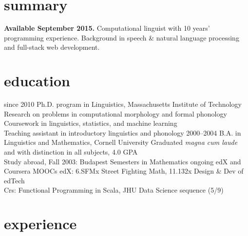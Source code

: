 \documentclass[]{friggeri-cv}
\begin{document}
\section{summary}

\textbf{Available September 2015.} Computational linguist with 10 years' programming experience. Background in speech \& natural language processing and full-stack web development.

\section{education}

\begin{entrylist}
  \entry
    {since 2010}
    {Ph.D. program in Linguistics, Massachusetts Institute of Technology}
    {}
    {%
     \Squaredot Research on problems in computational morphology and formal phonology \\
     \Squaredot Coursework in linguistics, statistics, and machine learning\\
     \Squaredot Teaching assistant in introductory linguistics and phonology
    }
  \entry
    {2000--2004}
    {B.A. in Linguistics and Mathematics, Cornell University}
    {}
    {
    \Squaredot Graduated \emph{magna cum laude} and with distinction in all subjects, 4.0 GPA \\
	\Squaredot Study abroad, Fall 2003: Budapest Semesters in Mathematics}
  \entry
    {ongoing}
    {edX and Coursera MOOCs}
    {}
    {
    \Squaredot edX: 6.SFMx Street Fighting Math, 11.132x Design \& Dev of edTech \\
    \Squaredot Crs: Functional Programming in Scala, JHU Data Science sequence (5/9)}
\end{entrylist}

\section{experience}
\end{document}
